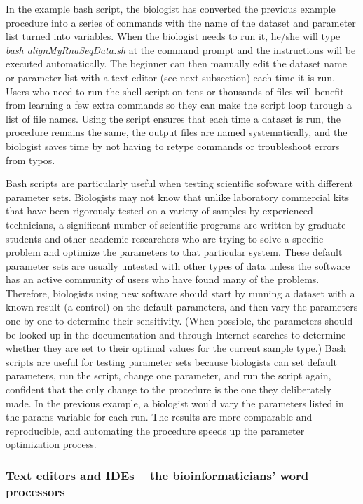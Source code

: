 \documentclass[ChapterTOCs,krantz2]{krantz} %
\begin{document}
In the example bash script, the biologist has converted the
previous example procedure into a series of commands with the name of the
dataset and parameter list turned into variables.  When the biologist needs
to run it, he/she will type \emph{bash alignMyRnaSeqData.sh} at the command prompt and
the instructions will be executed automatically.  The beginner can then
manually edit the dataset name or parameter list with a text editor (see next
subsection) each time it is run.  Users who
need to run the shell script on tens or thousands of files
will benefit from learning a few extra commands so they can make the script
loop through a list of file names.  Using the script ensures that each time a
dataset is run, the procedure remains the same, the output files are named
systematically, and the biologist saves time by not having to retype commands
or troubleshoot errors from typos.

Bash scripts are particularly useful when testing scientific software with
different parameter sets.  Biologists may not know that
unlike laboratory commercial kits that have been rigorously tested on a
variety of samples by experienced technicians, a significant
number of scientific programs are written by graduate students and other
academic researchers who are trying to solve a specific problem and optimize
the parameters to that particular system.  These default parameter sets are
usually untested with other types of data unless the software
has an active community of users who
have found many of the problems.  Therefore, biologists using new software should start by running a dataset with a known result (a control) on
the default parameters, and then vary the parameters one by one to determine
their sensitivity.  (When possible, the parameters should be looked up in the
documentation and through Internet searches to determine whether they are set
to their optimal values for the current sample type.)  Bash scripts are useful
for testing parameter sets because biologists can set default parameters, run
the script, change one parameter, and run the script again, confident that the
only change to the procedure is the one they deliberately made.  In the
previous example, a biologist would vary the parameters listed in the params
variable for each run.  The results are more comparable and reproducible, and automating the procedure speeds up the parameter optimization process.

\subsubsection{Text editors and IDEs -- the bioinformaticians' word processors}
\end{document}
